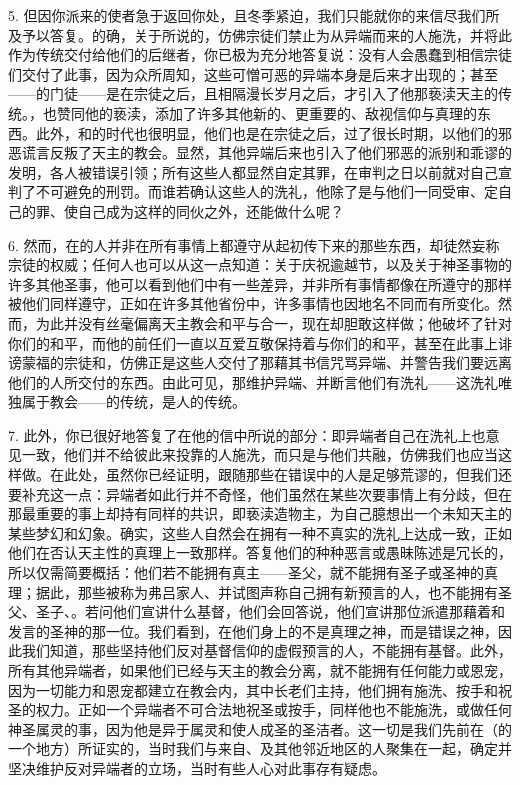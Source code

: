 5. 但因你派来的使者急于返回你处，且冬季紧迫，我们只能就你的来信尽我们所及予以答复。的确，关于所说的，仿佛宗徒们禁止为从异端而来的人施洗，并将此作为传统交付给他们的后继者，你已极为充分地答复说：没有人会愚蠢到相信宗徒们交付了此事，因为众所周知，这些可憎可恶的异端本身是后来才出现的；甚至——的门徒——是在宗徒之后，且相隔漫长岁月之后，才引入了他那亵渎天主的传统。，也赞同他的亵渎，添加了许多其他新的、更重要的、敌视信仰与真理的东西。此外，和的时代也很明显，他们也是在宗徒之后，过了很长时期，以他们的邪恶谎言反叛了天主的教会。显然，其他异端后来也引入了他们邪恶的派别和乖谬的发明，各人被错误引领；所有这些人都显然自定其罪，在审判之日以前就对自己宣判了不可避免的刑罚。而谁若确认这些人的洗礼，他除了是与他们一同受审、定自己的罪、使自己成为这样的同伙之外，还能做什么呢？\par

6. 然而，在的人并非在所有事情上都遵守从起初传下来的那些东西，却徒然妄称宗徒的权威；任何人也可以从这一点知道：关于庆祝逾越节，以及关于神圣事物的许多其他圣事，他可以看到他们中有一些差异，并非所有事情都像在所遵守的那样被他们同样遵守，正如在许多其他省份中，许多事情也因地名不同而有所变化。然而，为此并没有丝毫偏离天主教会和平与合一，现在却胆敢这样做；他破坏了针对你们的和平，而他的前任们一直以互爱互敬保持着与你们的和平，甚至在此事上诽谤蒙福的宗徒和，仿佛正是这些人交付了那藉其书信咒骂异端、并警告我们要远离他们的人所交付的东西。由此可见，那维护异端、并断言他们有洗礼——这洗礼唯独属于教会——的传统，是人的传统。\par

7. 此外，你已很好地答复了在他的信中所说的部分：即异端者自己在洗礼上也意见一致，他们并不给彼此来投靠的人施洗，而只是与他们共融，仿佛我们也应当这样做。在此处，虽然你已经证明，跟随那些在错误中的人是足够荒谬的，但我们还要补充这一点：异端者如此行并不奇怪，他们虽然在某些次要事情上有分歧，但在那最重要的事上却持有同样的共识，即亵渎造物主，为自己臆想出一个未知天主的某些梦幻和幻象。确实，这些人自然会在拥有一种不真实的洗礼上达成一致，正如他们在否认天主性的真理上一致那样。答复他们的种种恶言或愚昧陈述是冗长的，所以仅需简要概括：他们若不能拥有真主——圣父，就不能拥有圣子或圣神的真理；据此，那些被称为弗吕家人、并试图声称自己拥有新预言的人，也不能拥有圣父、圣子、。若问他们宣讲什么基督，他们会回答说，他们宣讲那位派遣那藉着和发言的圣神的那一位。我们看到，在他们身上的不是真理之神，而是错误之神，因此我们知道，那些坚持他们反对基督信仰的虚假预言的人，不能拥有基督。此外，所有其他异端者，如果他们已经与天主的教会分离，就不能拥有任何能力或恩宠，因为一切能力和恩宠都建立在教会内，其中长老们主持，他们拥有施洗、按手和祝圣的权力。正如一个异端者不可合法地祝圣或按手，同样他也不能施洗，或做任何神圣属灵的事，因为他是异于属灵和使人成圣的圣洁者。这一切是我们先前在（的一个地方）所证实的，当时我们与来自、及其他邻近地区的人聚集在一起，确定并坚决维护反对异端者的立场，当时有些人心对此事存有疑虑。\par

